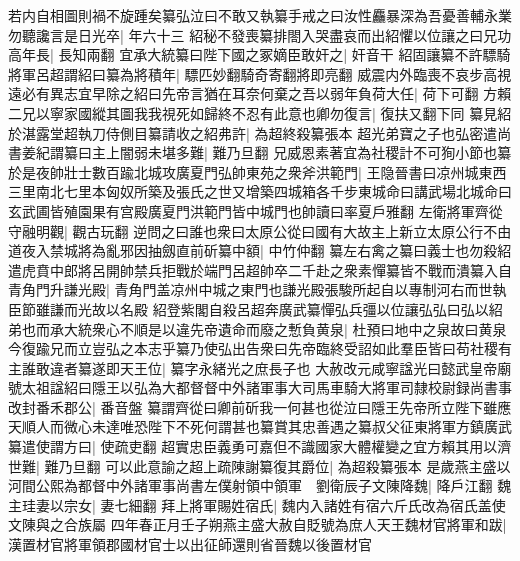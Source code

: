 若内自相圖則禍不旋踵矣纂弘泣曰不敢又執纂手戒之曰汝性麤暴深為吾憂善輔永業勿聽讒言是日光卒|{
	年六十三}
紹秘不發喪纂排閤入哭盡哀而出紹懼以位讓之曰兄功高年長|{
	長知兩翻}
宜承大統纂曰陛下國之冢嫡臣敢奸之|{
	奸音干}
紹固讓纂不許驃騎將軍呂超謂紹曰纂為將積年|{
	驃匹妙翻騎奇寄翻將即亮翻}
威震内外臨喪不哀步高視遠必有異志宜早除之紹曰先帝言猶在耳奈何棄之吾以弱年負荷大任|{
	荷下可翻}
方賴二兄以寧家國縱其圖我我視死如歸終不忍有此意也卿勿復言|{
	復扶又翻下同}
纂見紹於湛露堂超執刀侍側目纂請收之紹弗許|{
	為超終殺纂張本}
超光弟寶之子也弘密遣尚書姜紀謂纂曰主上闇弱未堪多難|{
	難乃旦翻}
兄威恩素著宜為社稷計不可狥小節也纂於是夜帥壯士數百踰北城攻廣夏門弘帥東苑之衆斧洪範門|{
	王隐晉書曰凉州城東西三里南北七里本匈奴所築及張氏之世又增築四城箱各千步東城命曰講武場北城命曰玄武圃皆殖園果有宫殿廣夏門洪範門皆中城門也帥讀曰率夏戶雅翻}
左衛將軍齊從守融明觀|{
	觀古玩翻}
逆問之曰誰也衆曰太原公從曰國有大故主上新立太原公行不由道夜入禁城將為亂邪因抽劔直前斫纂中額|{
	中竹仲翻}
纂左右禽之纂曰義士也勿殺紹遣虎賁中郎將呂開帥禁兵拒戰於端門呂超帥卒二千赴之衆素憚纂皆不戰而潰纂入自青角門升謙光殿|{
	青角門盖凉州中城之東門也謙光殿張駿所起自以專制河右而世執臣節雖謙而光故以名殿}
紹登紫閣自殺呂超奔廣武纂憚弘兵彊以位讓弘弘曰弘以紹弟也而承大統衆心不順是以違先帝遺命而廢之慙負黄泉|{
	杜預曰地中之泉故曰黄泉}
今復踰兄而立豈弘之本志乎纂乃使弘出告衆曰先帝臨終受詔如此羣臣皆曰苟社稷有主誰敢違者纂遂即天王位|{
	纂字永緒光之庶長子也}
大赦改元咸寧諡光曰懿武皇帝廟號太祖諡紹曰隱王以弘為大都督督中外諸軍事大司馬車騎大將軍司隸校尉録尚書事改封番禾郡公|{
	番音盤}
纂謂齊從曰卿前斫我一何甚也從泣曰隱王先帝所立陛下雖應天順人而微心未達唯恐陛下不死何謂甚也纂賞其忠善遇之纂叔父征東將軍方鎮廣武纂遣使謂方曰|{
	使疏吏翻}
超實忠臣義勇可嘉但不識國家大體權變之宜方賴其用以濟世難|{
	難乃旦翻}
可以此意諭之超上疏陳謝纂復其爵位|{
	為超殺纂張本}
是歲燕主盛以河間公熙為都督中外諸軍事尚書左僕射領中領軍　劉衛辰子文陳降魏|{
	降戶江翻}
魏主珪妻以宗女|{
	妻七細翻}
拜上將軍賜姓宿氏|{
	魏内入諸姓有宿六斤氏改為宿氏盖使文陳與之合族屬}
四年春正月壬子朔燕主盛大赦自貶號為庶人天王魏材官將軍和跋|{
	漢置材官將軍領郡國材官士以出征師還則省晉魏以後置材官}


